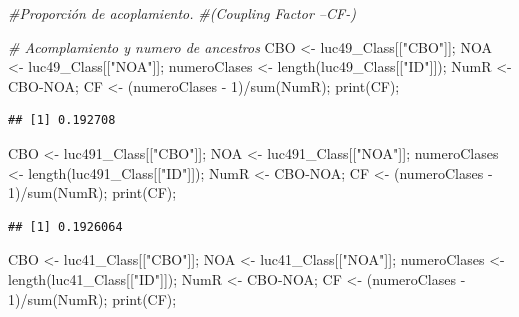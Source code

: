 \documentclass[
]{article}
\newenvironment{Shaded}{\begin{snugshade}}{\end{snugshade}}
\newcommand{\CommentTok}[1]{\textcolor[rgb]{0.56,0.35,0.01}{\textit{#1}}}
\newcommand{\DecValTok}[1]{\textcolor[rgb]{0.00,0.00,0.81}{#1}}
\newcommand{\FunctionTok}[1]{\textcolor[rgb]{0.00,0.00,0.00}{#1}}
\newcommand{\NormalTok}[1]{#1}
\newcommand{\OtherTok}[1]{\textcolor[rgb]{0.56,0.35,0.01}{#1}}
\newcommand{\SpecialCharTok}[1]{\textcolor[rgb]{0.00,0.00,0.00}{#1}}
\newcommand{\StringTok}[1]{\textcolor[rgb]{0.31,0.60,0.02}{#1}}
\begin{document}
\begin{Shaded}
\begin{Highlighting}[]
\CommentTok{\#Proporción de acoplamiento.}
\CommentTok{\#(Coupling Factor –CF{-})}


\CommentTok{\# Acomplamiento y numero de ancestros}
\NormalTok{CBO }\OtherTok{\textless{}{-}}\NormalTok{ luc49\_Class[[}\StringTok{"CBO"}\NormalTok{]];}
\NormalTok{NOA }\OtherTok{\textless{}{-}}\NormalTok{ luc49\_Class[[}\StringTok{"NOA"}\NormalTok{]];}
\NormalTok{numeroClases }\OtherTok{\textless{}{-}} \FunctionTok{length}\NormalTok{(luc49\_Class[[}\StringTok{"ID"}\NormalTok{]]);}
\NormalTok{NumR }\OtherTok{\textless{}{-}}\NormalTok{ CBO}\SpecialCharTok{{-}}\NormalTok{NOA;}
\NormalTok{CF }\OtherTok{\textless{}{-}}\NormalTok{ (numeroClases }\SpecialCharTok{{-}} \DecValTok{1}\NormalTok{)}\SpecialCharTok{/}\FunctionTok{sum}\NormalTok{(NumR);}
\FunctionTok{print}\NormalTok{(CF);}
\end{Highlighting}
\end{Shaded}

\begin{verbatim}
## [1] 0.192708
\end{verbatim}

\begin{Shaded}
\begin{Highlighting}[]
\NormalTok{CBO }\OtherTok{\textless{}{-}}\NormalTok{ luc491\_Class[[}\StringTok{"CBO"}\NormalTok{]];}
\NormalTok{NOA }\OtherTok{\textless{}{-}}\NormalTok{ luc491\_Class[[}\StringTok{"NOA"}\NormalTok{]];}
\NormalTok{numeroClases }\OtherTok{\textless{}{-}} \FunctionTok{length}\NormalTok{(luc491\_Class[[}\StringTok{"ID"}\NormalTok{]]);}
\NormalTok{NumR }\OtherTok{\textless{}{-}}\NormalTok{ CBO}\SpecialCharTok{{-}}\NormalTok{NOA;}
\NormalTok{CF }\OtherTok{\textless{}{-}}\NormalTok{ (numeroClases }\SpecialCharTok{{-}} \DecValTok{1}\NormalTok{)}\SpecialCharTok{/}\FunctionTok{sum}\NormalTok{(NumR);}
\FunctionTok{print}\NormalTok{(CF);}
\end{Highlighting}
\end{Shaded}

\begin{verbatim}
## [1] 0.1926064
\end{verbatim}

\begin{Shaded}
\begin{Highlighting}[]
\NormalTok{CBO }\OtherTok{\textless{}{-}}\NormalTok{ luc41\_Class[[}\StringTok{"CBO"}\NormalTok{]];}
\NormalTok{NOA }\OtherTok{\textless{}{-}}\NormalTok{ luc41\_Class[[}\StringTok{"NOA"}\NormalTok{]];}
\NormalTok{numeroClases }\OtherTok{\textless{}{-}} \FunctionTok{length}\NormalTok{(luc41\_Class[[}\StringTok{"ID"}\NormalTok{]]);}
\NormalTok{NumR }\OtherTok{\textless{}{-}}\NormalTok{ CBO}\SpecialCharTok{{-}}\NormalTok{NOA;}
\NormalTok{CF }\OtherTok{\textless{}{-}}\NormalTok{ (numeroClases }\SpecialCharTok{{-}} \DecValTok{1}\NormalTok{)}\SpecialCharTok{/}\FunctionTok{sum}\NormalTok{(NumR);}
\FunctionTok{print}\NormalTok{(CF);}
\end{Highlighting}
\end{Shaded}
\end{document}
